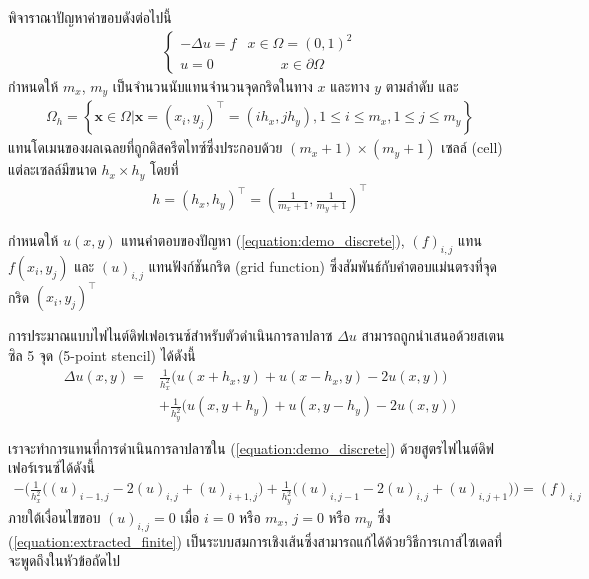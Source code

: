 \begin{Example}
    พิจาราณาปัญหาค่าขอบดังต่อไปนี้
    \begin{align}
        \left \{ \begin{array}{ll}   -\Delta u = f & x \in \Omega =	(0,1)^2	 \\
        u = 0 & \hspace{1cm} x \in \partial \Omega \end{array} \right . 
        \label{equation:demo_discrete}
    \end{align}
    \hspace{1cm} กำหนดให้ $m_x$, $m_y$ เป็นจำนวนนับแทนจำนวนจุดกริดในทาง $x$ และทาง $y$ ตามลำดับ และ
    \begin{align*}
        \Omega_{h}=\left\{ \mathbf{x} \in \Omega | \mathbf{x}=(x_i,y_j)^{\top} = (ih_x,jh_y), 1 \leq i \leq m_x, 1 \leq j \leq m_y  \right\}
    \end{align*}
    แทนโดเมนของผลเฉลยที่ถูกดิสครีตไทซ์ซึ่งประกอบด้วย $(m_x+1) \times (m_y+1)$ เซลล์ (cell) แต่ละเซลล์มีขนาด $h_x \times h_y$ โดยที่
    \begin{align*}
        h = (h_x,h_y)^{\top} = (\frac{1}{m_x+1},\frac{1}{m_y+1})^{\top}
    \end{align*}

    \hspace{1cm} กำหนดให้ $u(x,y)$ แทนคำตอบของปัญหา (\ref{equation:demo_discrete}), $(f)_{i,j}$ แทน $f(x_i,y_j)$ และ $(u)_{i,j}$ แทนฟังก์ชันกริด (grid function) ซึ่งสัมพันธ์กับคำตอบแม่นตรงที่จุดกริด $(x_i,y_j)^{\top}$ 
    
    \hspace{1cm} การประมาณแบบไฟไนต์ดิฟเฟอเรนซ์สำหรับตัวดำเนินการลาปลาซ $\Delta u$ สามารถถูกนำเสนอด้วยสเตนซิล 5 จุด (5-point stencil) ได้ดังนี้
    \begin{align}
        \nonumber \Delta u(x,y) = &\frac{1}{h_x^2} \Big( u(x+h_x,y) + u(x-h_x,y) - 2 u(x,y) \Big) \\&+ \frac{1}{h_y^2} \Big( u(x,y+h_y) + u(x,y-h_y) - 2 u(x,y) \Big) 
        \label{equation:5point-stencil}
    \end{align}

    เราจะทำการแทนที่การดำเนินการลาปลาซใน  (\ref{equation:demo_discrete}) ด้วยสูตรไฟไนต์ดิฟเฟอร์เรนซ์ได้ดังนี้
    \begin{align}
        - \Big( \frac{1}{h_x^2} \big( (u)_{i-1,j} - 2(u)_{i,j} + (u)_{i+1,j}\big) + \frac{1}{h_y^2} \big( (u)_{i,j-1} - 2(u)_{i,j} + (u)_{i,j+1}\big) \Big) = (f)_{i,j}
        \label{equation:extracted_finite}
    \end{align}
    ภายใต้เงื่อนไขขอบ $(u)_{i,j} = 0$ เมื่อ $i = 0$ หรือ $m_x$, $j = 0$ หรือ $m_y$ ซึ่ง (\ref{equation:extracted_finite}) เป็นระบบสมการเชิงเส้นซึ่งสามารถแก้ได้ด้วยวิธีการเกาส์ไซเดลที่จะพูดถึงในหัวข้อถัดไป
\end{Example}
